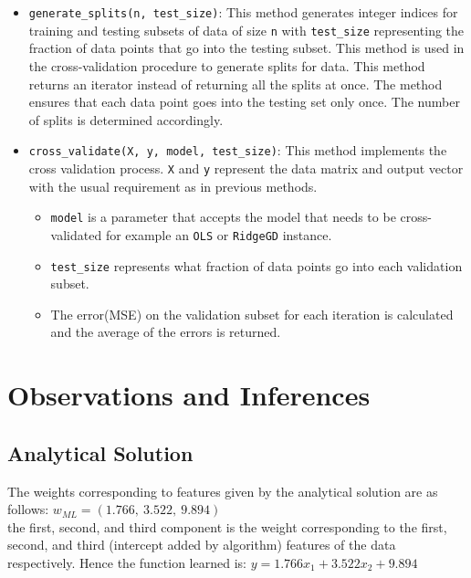 \documentclass[a4paper]{article}
\begin{document}
\begin{itemize}
\begin{itemize}
        \item \verb|fit(X, y)| method calculates the $\alpha$.
        
        \item \verb|predict(X)| method calculates the predictions by calculating $K^{new}$ and using the already calculated $\alpha$.
    \end{itemize}

    \item \verb|generate_splits(n, test_size)|: This method generates integer indices for training and testing subsets of data of size \verb|n| with \verb|test_size| representing the fraction of data points that go into the testing subset. This method is used in the cross-validation procedure to generate splits for data. This method returns an iterator instead of returning all the splits at once. The method ensures that each data point goes into the testing set only once. The number of splits is determined accordingly.

    \item \verb|cross_validate(X, y, model, test_size)|: This method implements the cross validation process. \verb|X| and \verb|y| represent the data matrix and output vector with the usual requirement as in previous methods.
    \begin{itemize}
        \item  \verb|model| is a parameter that accepts the model that needs to be cross-validated for example an \verb|OLS| or \verb|RidgeGD| instance.
    
        \item \verb|test_size| represents what fraction of data points go into each validation subset.
    
        \item The error(MSE) on the validation subset for each iteration is calculated and the average of the errors is returned.
    \end{itemize}
\end{itemize}

\section{Observations and Inferences}
\subsection{Analytical Solution}
The weights corresponding to features given by the analytical solution are as follows:
$w_{ML}=(1.766, \ 3.522, \ 9.894)$ \\
the first, second, and third component is the weight corresponding to the first, second, and third (intercept added by algorithm) features of the data respectively. Hence the function learned is: $y=1.766x_1+3.522x_2+9.894$
\end{document}
